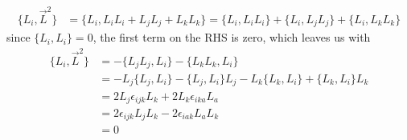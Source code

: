 \documentclass{article}
\theoremstyle{definition}
\begin{document}
\begin{enumerate}[label=(\alph*)]
	\begin{align*}
	\{ L_i , \vec{L}^2 \} 
	&= \{ L_i , L_i L_i + L_jL_j + L_kL_k \} = \{L_i, L_iL_i\} +  \{L_i, L_jL_j \} + \{ L_i, L_kL_k \}
	\end{align*}
	since $\{L_i,L_i\} = 0$, the first term on the RHS is zero, which leaves us with
	\begin{align*}
	\boxed{\{ L_i , \vec{L}^2 \}} &= -\{L_jL_j, L_i\} - \{ L_kL_k, L_i \} \\
	&= -L_j\{ L_j,L_i \} - \{L_j,L_i\}L_j - L_k\{ L_k,L_i \} + \{L_k,L_i\}L_k \\
	&= 2L_j\epsilon_{ijk}L_k + 2L_k \epsilon_{ika}L_a\\
	&= 2\epsilon_{ijk}L_jL_k - 2\epsilon_{iak}L_aL_k\\
	&=\boxed{0}
	\end{align*}
	

\end{enumerate}
\end{document}
